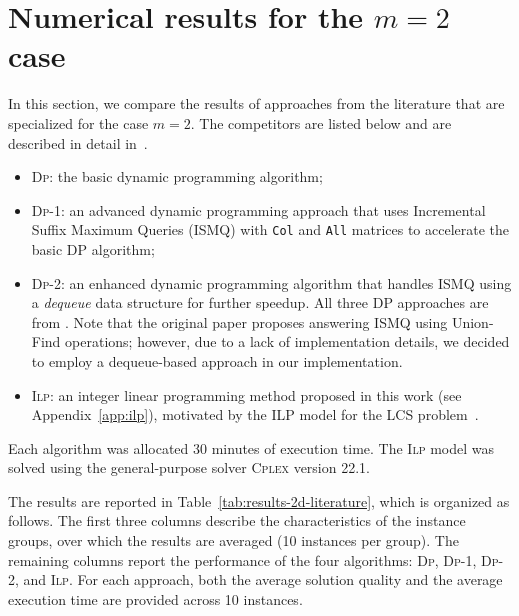 \documentclass[runningheads]{llncs}
\begin{document}
 \section{Numerical results for the $m=2$ case}
 
 In this section, we compare the results of approaches from the literature that are specialized for the case $m=2$. The competitors are listed below and are described in detail in~\cite{penga2011longest}.

\begin{itemize}
	\item \textsc{Dp}: the basic dynamic programming algorithm;
	\item \textsc{Dp}-1: an advanced dynamic programming approach that uses Incremental Suffix Maximum Queries (ISMQ) with \texttt{Col} and \texttt{All} matrices to accelerate the basic DP algorithm;
	\item \textsc{Dp}-2: an enhanced dynamic programming algorithm that handles ISMQ using a \textit{dequeue} data structure for further speedup. All three DP approaches are from \cite{penga2011longest}. Note that the original paper proposes answering ISMQ using Union-Find operations; however, due to a lack of implementation details, we decided to employ a dequeue-based approach in our implementation.
	\item \textsc{Ilp}: an integer linear programming method proposed in this work (see Appendix~\ref{app:ilp}), motivated by the ILP model for the LCS problem~\cite{blum2016metaheuristics}.
\end{itemize}

Each algorithm was allocated 30 minutes of execution time. The \textsc{Ilp} model was solved using the general-purpose solver \textsc{Cplex} version 22.1.

The results are reported in Table~\ref{tab:results-2d-literature}, which is organized as follows. The first three columns describe the characteristics of the instance groups, over which the results are averaged (10 instances per group). The remaining columns report the performance of the four algorithms: \textsc{Dp}, \textsc{Dp}-1, \textsc{Dp}-2, and \textsc{Ilp}. For each approach, both the average solution quality and the average execution time are provided across 10 instances.
\end{document}
